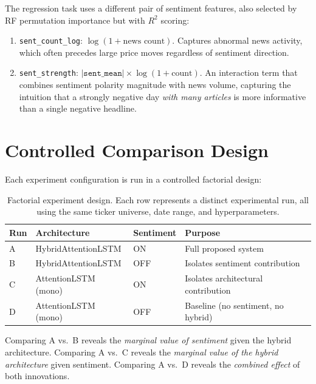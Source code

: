 The regression task uses a different pair of sentiment features, also selected
by RF permutation importance but with $R^2$ scoring:

\begin{enumerate}
  \item \texttt{sent\_count\_log}: $\log(1 + \text{news count})$.  Captures
        abnormal news activity, which often precedes large price moves
        regardless of sentiment direction.

  \item \texttt{sent\_strength}: $|\texttt{sent\_mean}| \times
        \log(1 + \text{count})$.  An interaction term that combines sentiment
        polarity magnitude with news volume, capturing the intuition that
        a strongly negative day \emph{with many articles} is more informative
        than a single negative headline.
\end{enumerate}

\section{Controlled Comparison Design}
\label{sec:controlled}

Each experiment configuration is run in a controlled factorial design:

\begin{table}[htbp]
\centering
\caption{Factorial experiment design.  Each row represents a distinct
experimental run, all using the same ticker universe, date range, and
hyperparameters.}
\label{tab:factorial}
\begin{tabular}{@{}lllp{6cm}@{}}
\toprule
\textbf{Run} & \textbf{Architecture} & \textbf{Sentiment} & \textbf{Purpose} \\
\midrule
A & HybridAttentionLSTM  & ON  & Full proposed system \\
B & HybridAttentionLSTM  & OFF & Isolates sentiment contribution \\
C & AttentionLSTM (mono) & ON  & Isolates architectural contribution \\
D & AttentionLSTM (mono) & OFF & Baseline (no sentiment, no hybrid) \\
\bottomrule
\end{tabular}
\end{table}

\noindent
Comparing A vs.\ B reveals the \emph{marginal value of sentiment} given the
hybrid architecture.  Comparing A vs.\ C reveals the \emph{marginal value of
the hybrid architecture} given sentiment.  Comparing A vs.\ D reveals the
\emph{combined effect} of both innovations.

